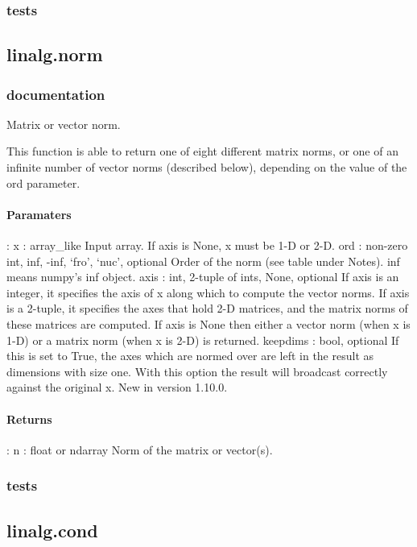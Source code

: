 \documentclass[a4paper,11pt]{article}
\begin{document}
\subsubsection{tests}
\subsection{linalg.norm}
\subsubsection{documentation}
Matrix or vector norm.

This function is able to return one of eight different matrix norms, or one of an infinite number of vector norms (described below), depending on the value of the ord parameter.\\

\paragraph{Paramaters}: 
x : array\_like
Input array. If axis is None, x must be 1-D or 2-D.
ord : {non-zero int, inf, -inf, ‘fro’, ‘nuc’}, optional
Order of the norm (see table under Notes). inf means numpy’s inf object.
axis : {int, 2-tuple of ints, None}, optional
If axis is an integer, it specifies the axis of x along which to compute the vector norms. If axis is a 2-tuple, it specifies the axes that hold 2-D matrices, and the matrix norms of these matrices are computed. If axis is None then either a vector norm (when x is 1-D) or a matrix norm (when x is 2-D) is returned.
keepdims : bool, optional
If this is set to True, the axes which are normed over are left in the result as dimensions with size one. With this option the result will broadcast correctly against the original x.
New in version 1.10.0.\\

\paragraph{Returns}:    
n : float or ndarray
Norm of the matrix or vector(s).\\

\subsubsection{tests}
\subsection{linalg.cond}
\end{document}

